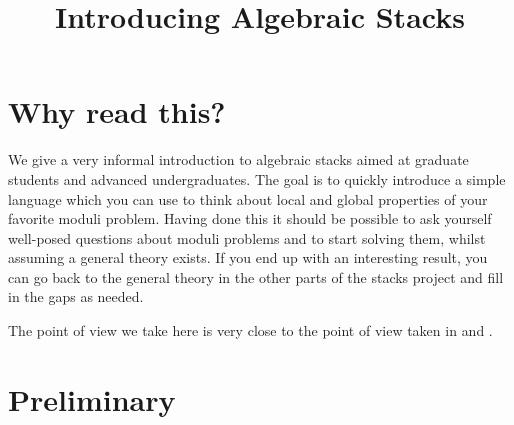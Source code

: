 

%


\title{Introducing Algebraic Stacks}

\maketitle

\label{section-phantom}

\tableofcontents




\section{Why read this?}
\label{section-introduction}

\noindent
We give a very informal introduction to algebraic stacks aimed at graduate
students and advanced undergraduates. The goal is to
quickly introduce a simple language which you can use to think
about local and global properties of your favorite moduli problem.
Having done this it should be possible to ask yourself well-posed questions
about moduli problems and to start solving them, whilst assuming a general
theory exists. If you end up with an interesting result,
you can go back to the general theory in the other parts of the stacks
project and fill in the gaps as needed.

\medskip\noindent
The point of view we take here is very close to the point of view taken in
\cite{KatzMazur} and \cite{mumford_picard}.






\section{Preliminary}
\label{section-preliminary}

